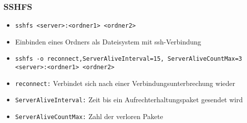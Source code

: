 \begin{frame}
\frametitle{SSHFS}
\begin{itemize}
\item \texttt{sshfs <server>:<ordner1> <ordner2>}
\pause
\item Einbinden eines Ordners als Dateisystem mit ssh-Verbindung
\pause
\item \texttt{sshfs -o reconnect,ServerAliveInterval=15, ServerAliveCountMax=3 <server>:<ordner1> <ordner2>}
\pause
\item \texttt{reconnect:} Verbindet sich nach einer Verbindungsunterbrechung wieder
\pause
\item \texttt{ServerAliveInterval:} Zeit bis ein Aufrechterhaltungspaket gesendet wird
\pause
\item \texttt{ServerAliveCountMax:} Zahl der verloren Pakete
\end{itemize}
\end{frame}